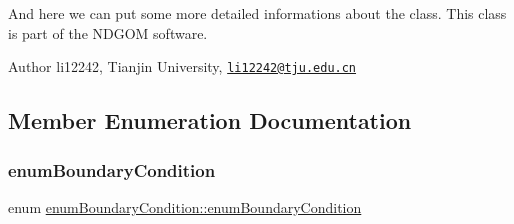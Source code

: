 And here we can put some more detailed informations about the class. This class is part of the N\+D\+G\+OM software. \begin{DoxyAuthor}{Author}
li12242, Tianjin University, \href{mailto:li12242@tju.edu.cn}{\tt li12242@tju.\+edu.\+cn} 
\end{DoxyAuthor}


\subsection{Member Enumeration Documentation}
\mbox{\label{classenum_boundary_condition_a5c2eea43befdf6aff164a1177b1cceb0}} 
\subsubsection{\texorpdfstring{enum\+Boundary\+Condition}{enumBoundaryCondition}}
{\footnotesize\ttfamily enum \hyperlink{classenum_boundary_condition_a5c2eea43befdf6aff164a1177b1cceb0}{enum\+Boundary\+Condition\+::enum\+Boundary\+Condition}}

